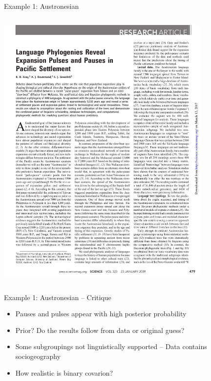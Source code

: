 \documentclass[9pt]{beamer}
\begin{document}
\begin{frame}{Example 1: Austronesian}
\begin{columns}
\begin{column}{0.5\textwidth}
        \includegraphics[width=0.8\textwidth,page=3,trim={1cm 1cm 7.5cm 16cm},clip]{austronesian.pdf}
        
    \end{column}
  \end{columns}
\end{frame}
\begin{frame}{Example 1: Austronesian – Critique}
  \begin{itemize}
  \item Pauses and pulses appear with high posterior probability
  \item Prior? Do the results follow from data or original guess?
  \item Some subgroupings not linguistically supported – Data contains sociogeography
  \item How realistic is binary covarion?
  \end{itemize}
\end{frame}
\end{document}
